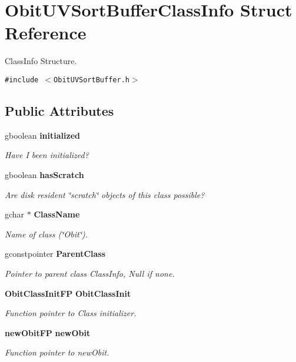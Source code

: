 \section{Obit\-UVSort\-Buffer\-Class\-Info Struct Reference}
\label{structObitUVSortBufferClassInfo}
Class\-Info Structure.  


{\tt \#include $<$Obit\-UVSort\-Buffer.h$>$}

\subsection*{Public Attributes}
\begin{CompactItemize}
\item 
gboolean {\bf initialized}
\begin{CompactList}\small\item\em Have I been initialized? \item\end{CompactList}\item 
gboolean {\bf has\-Scratch}
\begin{CompactList}\small\item\em Are disk resident \char`\"{}scratch\char`\"{} objects of this class possible? \item\end{CompactList}\item 
gchar $\ast$ {\bf Class\-Name}
\begin{CompactList}\small\item\em Name of class (\char`\"{}Obit\char`\"{}). \item\end{CompactList}\item 
gconstpointer {\bf Parent\-Class}
\begin{CompactList}\small\item\em Pointer to parent class Class\-Info, Null if none. \item\end{CompactList}\item 
{\bf Obit\-Class\-Init\-FP} {\bf Obit\-Class\-Init}
\begin{CompactList}\small\item\em Function pointer to Class initializer. \item\end{CompactList}\item 
{\bf new\-Obit\-FP} {\bf new\-Obit}
\begin{CompactList}\small\item\em Function pointer to new\-Obit. \item\end{CompactList}\item 

\end{CompactItemize}
